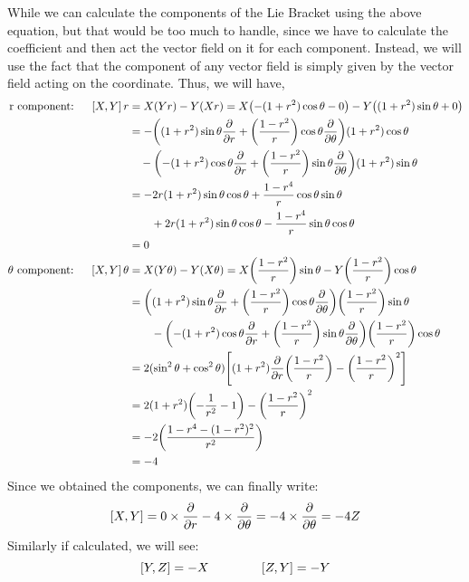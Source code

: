 While we can calculate the components of the Lie Bracket using the above equation, but that would be too much to handle, since we have to calculate the coefficient and then act the vector field on it for each component. Instead, we will use the fact that the component of any vector field is simply given by the vector field acting on the coordinate. Thus, we will have,
\begin{align*}
  \text{r component: }\quad  \left[ X, Y \right]r &=  X(Yr) - Y(Xr) = X\qty(-(1+r^2)\cos\theta- 0 )- Y\qty((1+r^2)\sin\theta+0)\\
  &=-\qty((1+r^2)\sin\theta\pdv{r} + \qty(\frac{1-r^2}{r})\cos\theta\pdv{\theta})(1+r^2)\cos\theta \\&\quad -\qty(-(1+r^2)\cos\theta\pdv{r} +\qty(\frac{1-r^2}{r})\sin\theta\pdv{\theta})(1+r^2)\sin\theta\\
  &=-2r(1+r^2)\sin\theta \cos\theta+\frac{1-r^4}{r}\cos\theta\sin\theta\\&\qquad+ 2r(1+r^2)\sin\theta\cos\theta - \frac{1-r^4}{r}\sin\theta\cos\theta\\
  &=0 \\
  \text{$\theta$ component: } \quad  \left[ X, Y \right]\theta &=  X(Y\theta) - Y(X\theta) = X\qty(\frac{1-r^2}{r})\sin\theta - Y\qty(\frac{1-r^2}{r})\cos\theta\\
  &=\qty((1+r^2)\sin\theta\pdv{r} + \qty(\frac{1-r^2}{r})\cos\theta\pdv{\theta})\qty(\frac{1-r^2}{r})\sin\theta\\
  &\qquad - \qty(-(1+r^2)\cos\theta\pdv{r} +\qty(\frac{1-r^2}{r})\sin\theta\pdv{\theta})\qty(\frac{1-r^2}{r})\cos\theta\\
  &=2(\sin^2\theta+\cos^2\theta)\qty[(1+r^2) \pdv{r}\qty(\frac{1-r^2}{r}) - \qty(\frac{1-r^2}{r})^2]\\
  &=2(1+r^2)\qty(-\frac{1}{r^2}-1) - \qty(\frac{1-r^2}{r})^2\\
  &= -2\qty(\frac{1-r^4 - (1-r^2)^2}{r^2})\\
  &=-4
\end{align*}
Since we obtained the components, we can finally write:
$$\left[ X, Y \right] = 0 \times \pdv{r} -4 \times \pdv{\theta} = -4\times\pdv{\theta} = -4Z$$
Similarly if calculated, we will see:
$$\left[ Y, Z \right] = -X \qquad\qquad \left[ Z, Y \right]=-Y$$
